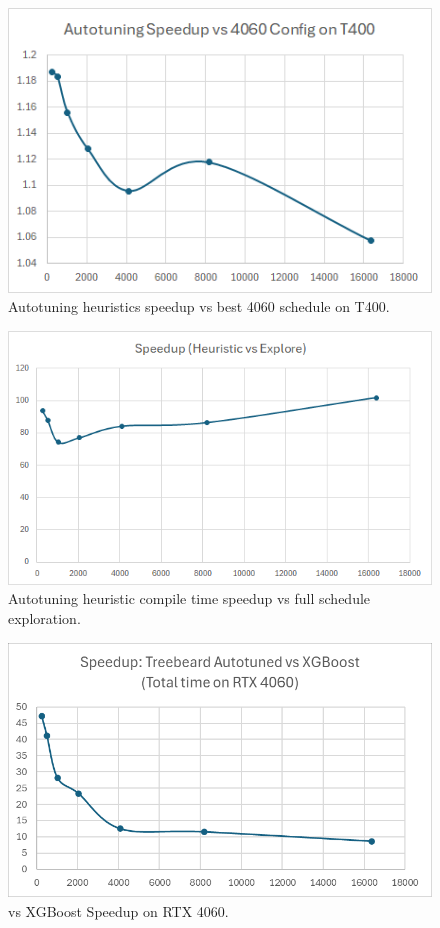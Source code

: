 \begin{figure}[htb]
  \centering
  \includegraphics[width=0.75\linewidth]{figures/AutotuningSpeedupvs4060Sched_T400.png}
  \caption{Autotuning heuristics speedup vs best 4060 schedule on T400.}
  \label{Fig:AutotuningSpeedupvs4060Sched_T400}
\end{figure}

\begin{figure}[htb]
  \centering
  \includegraphics[width=0.75\linewidth]{figures/HeuristicVsFullExplore_Speedup.png}
  \caption{Autotuning heuristic compile time speedup vs full schedule exploration.}
  \label{Fig:HeuristicVsFullExplore_Speedup}
\end{figure}

\begin{figure}[htb]
  \centering
  \includegraphics[width=0.75\linewidth]{figures/TBvsXGB_TotalTime.png}
  \caption{\Treebeard{} vs XGBoost Speedup on RTX 4060.}
  \label{Fig:TBvsXGBoost_Speedup}
\end{figure}

